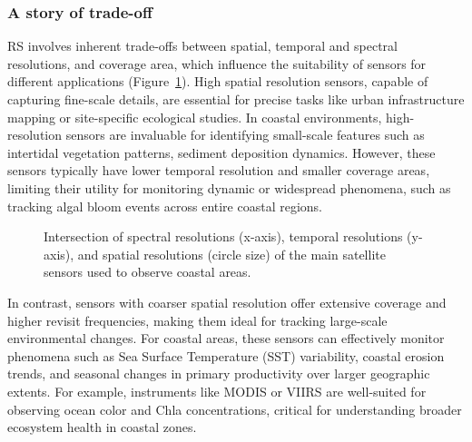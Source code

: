 \documentclass[
  letterpaper,
  11pt,
  english,
  singlespacing,
  headsepline]{MastersDoctoralThesis}
\begin{document}
\begin{spacing}{1.5}
\subsubsection{A story of trade-off}\label{a-story-of-trade-off}

RS involves inherent trade-offs between spatial, temporal and spectral
resolutions, and coverage area, which influence the suitability of
sensors for different applications
(Figure~\ref{fig-ResolutionSatellite}). High spatial resolution sensors,
capable of capturing fine-scale details, are essential for precise tasks
like urban infrastructure mapping or site-specific ecological studies.
In coastal environments, high-resolution sensors are invaluable for
identifying small-scale features such as intertidal vegetation patterns,
sediment deposition dynamics. However, these sensors typically have
lower temporal resolution and smaller coverage areas, limiting their
utility for monitoring dynamic or widespread phenomena, such as tracking
algal bloom events across entire coastal regions.

\begin{figure}


\caption{\label{fig-ResolutionSatellite}Intersection of spectral
resolutions (x-axis), temporal resolutions (y-axis), and spatial
resolutions (circle size) of the main satellite sensors used to observe
coastal areas.}

\end{figure}%

In contrast, sensors with coarser spatial resolution offer extensive
coverage and higher revisit frequencies, making them ideal for tracking
large-scale environmental changes. For coastal areas, these sensors can
effectively monitor phenomena such as Sea Surface Temperature (SST)
variability, coastal erosion trends, and seasonal changes in primary
productivity over larger geographic extents. For example, instruments
like MODIS or VIIRS are well-suited for observing ocean color and Chla
concentrations, critical for understanding broader ecosystem health in
coastal zones.


\end{spacing}
\end{document}
